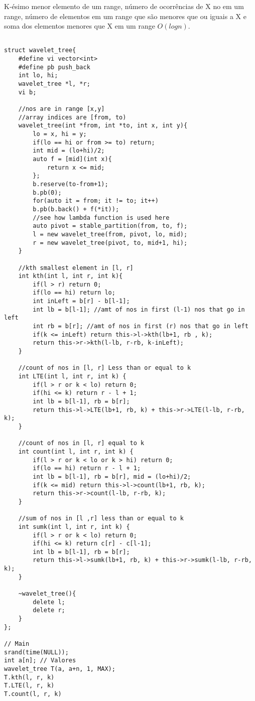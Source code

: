 K-ésimo menor elemento de um range, número de ocorrências de X no em um range, número de elementos em um range que são menores que ou iguais a X e soma dos elementos menores que X em um range $O(logn)$.
\begin{multicols}{2}
	\begin{lstlisting}

struct wavelet_tree{
	#define vi vector<int>
	#define pb push_back
	int lo, hi;
	wavelet_tree *l, *r;
	vi b;
	
	//nos are in range [x,y]
	//array indices are [from, to)
	wavelet_tree(int *from, int *to, int x, int y){
		lo = x, hi = y;
		if(lo == hi or from >= to) return;
		int mid = (lo+hi)/2;
		auto f = [mid](int x){
			return x <= mid;
		};
		b.reserve(to-from+1);
		b.pb(0);
		for(auto it = from; it != to; it++)
		b.pb(b.back() + f(*it));
		//see how lambda function is used here	
		auto pivot = stable_partition(from, to, f);
		l = new wavelet_tree(from, pivot, lo, mid);
		r = new wavelet_tree(pivot, to, mid+1, hi);
	}
	
	//kth smallest element in [l, r]
	int kth(int l, int r, int k){
		if(l > r) return 0;
		if(lo == hi) return lo;
		int inLeft = b[r] - b[l-1];
		int lb = b[l-1]; //amt of nos in first (l-1) nos that go in left 
		int rb = b[r]; //amt of nos in first (r) nos that go in left
		if(k <= inLeft) return this->l->kth(lb+1, rb , k);
		return this->r->kth(l-lb, r-rb, k-inLeft);
	}
	
	//count of nos in [l, r] Less than or equal to k
	int LTE(int l, int r, int k) {
		if(l > r or k < lo) return 0;
		if(hi <= k) return r - l + 1;
		int lb = b[l-1], rb = b[r];
		return this->l->LTE(lb+1, rb, k) + this->r->LTE(l-lb, r-rb, k);
	}
	
	//count of nos in [l, r] equal to k
	int count(int l, int r, int k) {
		if(l > r or k < lo or k > hi) return 0;
		if(lo == hi) return r - l + 1;
		int lb = b[l-1], rb = b[r], mid = (lo+hi)/2;
		if(k <= mid) return this->l->count(lb+1, rb, k);
		return this->r->count(l-lb, r-rb, k);
	}
	
	//sum of nos in [l ,r] less than or equal to k
	int sumk(int l, int r, int k) {
		if(l > r or k < lo) return 0;
		if(hi <= k) return c[r] - c[l-1];
		int lb = b[l-1], rb = b[r];
		return this->l->sumk(lb+1, rb, k) + this->r->sumk(l-lb, r-rb, k);
	}
	
	~wavelet_tree(){
		delete l;
		delete r;
	}
};

// Main
srand(time(NULL));
int a[n]; // Valores
wavelet_tree T(a, a+n, 1, MAX);
T.kth(l, r, k)
T.LTE(l, r, k)
T.count(l, r, k)
\end{lstlisting}
\end{multicols}